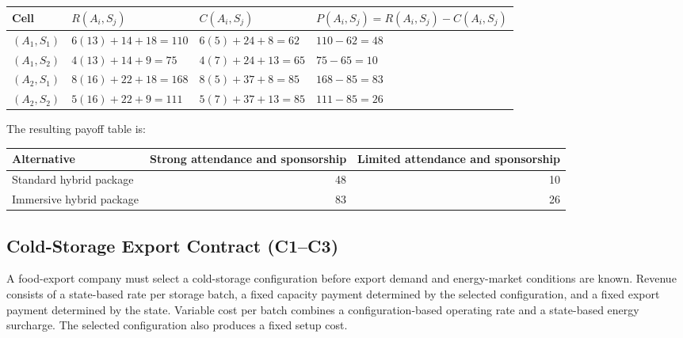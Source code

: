 \begin{center}
	\small
	\begin{tabular}{llll}
		\toprule
		Cell
		& \(R(A_i,S_j)\)
		& \(C(A_i,S_j)\)
		& \(P(A_i,S_j)=R(A_i,S_j)-C(A_i,S_j)\) \\
		\midrule
		\((A_1,S_1)\)
		& \(6(13)+14+18=110\)
		& \(6(5)+24+8=62\)
		& \(110-62=48\) \\
		
		\((A_1,S_2)\)
		& \(4(13)+14+9=75\)
		& \(4(7)+24+13=65\)
		& \(75-65=10\) \\
		
		\((A_2,S_1)\)
		& \(8(16)+22+18=168\)
		& \(8(5)+37+8=85\)
		& \(168-85=83\) \\
		
		\((A_2,S_2)\)
		& \(5(16)+22+9=111\)
		& \(5(7)+37+13=85\)
		& \(111-85=26\) \\
		\bottomrule
	\end{tabular}
\end{center}

The resulting payoff table is:

\begin{center}
	\begin{tabular}{lrr}
		\toprule
		Alternative
		& Strong attendance and sponsorship
		& Limited attendance and sponsorship \\
		\midrule
		Standard hybrid package & 48 & 10 \\
		Immersive hybrid package & 83 & 26 \\
		\bottomrule
	\end{tabular}
\end{center}


\subsection{Cold-Storage Export Contract (C1--C3)}
\label{sec:problem18-cold-storage-export-contract-c1-c3}

A food-export company must select a cold-storage configuration before export
demand and energy-market conditions are known. Revenue consists of a
state-based rate per storage batch, a fixed capacity payment determined by
the selected configuration, and a fixed export payment determined by the
state. Variable cost per batch combines a configuration-based operating rate
and a state-based energy surcharge. The selected configuration also produces
a fixed setup cost.

